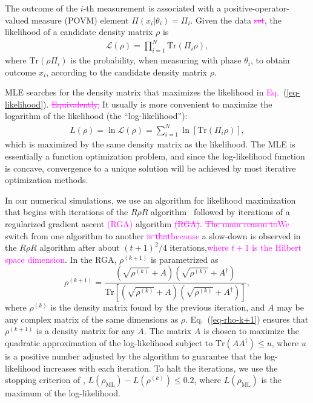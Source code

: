 \documentclass[
reprint,
superscriptaddress,
showpacs,
amsmath,
amssymb,
aps,
pra,
longbibliography
]{revtex4-1}
\providecommand{\aucmnt}[1]{#1}
\providecommand{\editcolor}[2]{\textcolor{#1}{#2}}
\providecommand{\aucmnt}[1]{}
\providecommand{\editcolor}[2]{#2}
\newcommand{\SG}[1]{\editcolor{magenta}{#1}}
\newcommand{\SGs}[1]{\aucmnt{\editcolor{magenta}{\sout{#1}}}}
\begin{document}
The outcome of the $i$-th measurement is associated with a
positive-operator-valued measure (POVM) element
$\Pi (x_i|\theta_i) = \Pi_i$. Given the data\SGs{ set}, the likelihood
of a candidate density matrix $\rho$ is
\begin{eqnarray}
  \mathcal{L} (\rho)= \prod_{i=1}^{N} \mathrm{Tr} (\Pi_i \rho),
  \label{eq-likelihood}
\end{eqnarray}
where $\mathrm{Tr}(\rho \Pi_i)$ is the probability, when measuring
with phase $\theta_i$, to obtain outcome $x_i$, according to the
candidate density matrix $\rho$.

MLE searches for the density matrix that maximizes the likelihood
in\SG{ Eq.}~(\ref{eq-likelihood}). \SGs{Equivalently, }It usually is
more convenient to maximize the logarithm of the likelihood (the
``log-likelihood''):
\begin{eqnarray}
  L (\rho) = \ln \mathcal{L} (\rho)= \sum_{i=1}^{N} \ln [\mathrm{Tr} (\Pi_i \rho)],
\end{eqnarray} 
which is maximized by the same density matrix as the likelihood. The
MLE is essentially a function optimization problem, and since the
log-likelihood function is concave, convergence to a unique solution
will be achieved by most iterative optimization methods.

In our numerical simulations, we use an algorithm for likelihood
maximization that begins with iterations of the $R\rho R$
algorithm~\cite{Rehacek2007} followed by iterations of a regularized
gradient ascent \SG{(RGA)} algorithm\SGs{ (RGA)}. \SGs{The main reason
  to}\SG{We } switch from one algorithm to another \SGs{is
  that}\SG{because} a slow-down is observed in the $R\rho R$ algorithm
after about $(t+1)^2/4$ iterations,\SG{where $t+1$ is the Hilbert
  space dimension}. In the RGA, $\rho^{(k+1)}$ is parametrized as
\begin{equation}
  \rho^{(k+1)}=\frac{\left(\sqrt{\rho^{(k)}}+A\right)\left(\sqrt{\rho^{(k)}}+A^{\dagger}\right)}{\mathrm{Tr}\left[\left(\sqrt{\rho^{(k)}}+A\right)\left(\sqrt{\rho^{(k)}}+A^{\dagger}\right)\right]},
  \label{eq-rho-k+1}
\end{equation}
where $\rho^{(k)}$ is the density matrix found by the previous
iteration, and $A$ may be any complex matrix of the same dimensions as
$\rho$. Eq.~(\ref{eq-rho-k+1}) ensures that $\rho^{(k+1)}$ is a
density matrix for any $A$. The matrix $A$ is chosen to maximize the
quadratic approximation of the log-likelihood subject to
$\text{Tr}(AA^{\dagger})\leq u$, where $u$ is a positive number
adjusted by the algorithm to guarantee that the log-likelihood
increases with each iteration. To halt the iterations, we use the
stopping criterion of \cite{Glancy2012},
$L(\rho_{\text{ML}})-L(\rho^{(k)})\leq 0.2$, where
$L(\rho_{\text{ML}})$ is the maximum of the log-likelihood.
\end{document}
